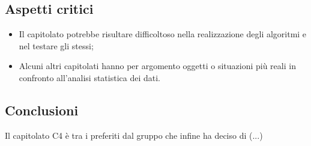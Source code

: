 \subsection{Aspetti critici}
\begin{itemize}
\item Il capitolato potrebbe risultare difficoltoso nella realizzazione degli algoritmi e nel testare gli stessi;
\item Alcuni altri capitolati hanno per argomento oggetti o situazioni più reali in confronto all'analisi statistica dei dati.
\end{itemize}

\subsection{Conclusioni}
Il capitolato C4 è tra i preferiti dal gruppo che infine ha deciso di (...)
